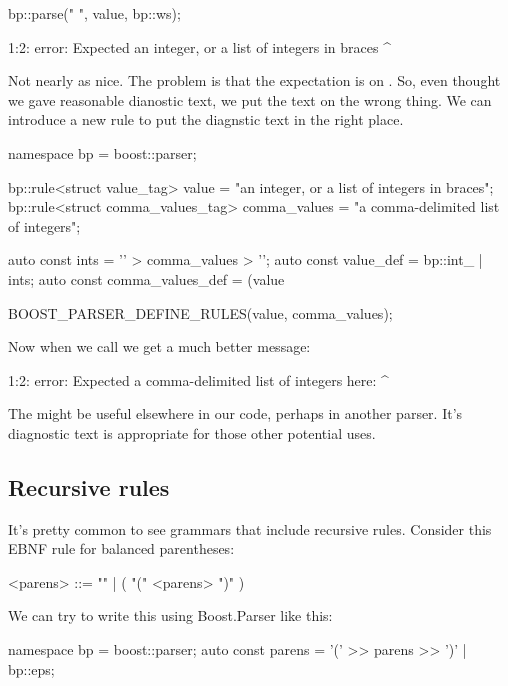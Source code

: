 \documentclass{MyBook}
\begin{document}
\begin{code}
bp::parse("{ }", value, bp::ws);
\end{code}

\begin{code}
1:2: error: Expected an integer, or a list of integers in braces %
{ }
  ^
\end{code}

Not nearly as nice. The problem is that the expectation is on . So, even thought we gave  reasonable dianostic text, we put the text on the wrong thing. We can introduce a new rule to put the diagnstic text in the right place.

\begin{code}
namespace bp = boost::parser;

bp::rule<struct value_tag> value =
    "an integer, or a list of integers in braces";
bp::rule<struct comma_values_tag> comma_values =
    "a comma-delimited list of integers";

auto const ints = '{' > comma_values > '}';
auto const value_def = bp::int_ | ints;
auto const comma_values_def = (value %

BOOST_PARSER_DEFINE_RULES(value, comma_values);
\end{code}

Now when we call  we get a much better message:

\begin{code}
1:2: error: Expected a comma-delimited list of integers here:
{ }
  ^
\end{code}

The   might be useful elsewhere in our code, perhaps in another parser. It's diagnostic text is appropriate for those other potential uses.

\subsection{Recursive rules}

It's pretty common to see grammars that include recursive rules. Consider this EBNF rule for balanced parentheses:

\begin{code}
<parens> ::= "" | ( "(" <parens> ")" )
\end{code}

We can try to write this using Boost.Parser like this:

\begin{code}
namespace bp = boost::parser;
auto const parens = '(' >> parens >> ')' | bp::eps;
\end{code}
\end{document}
